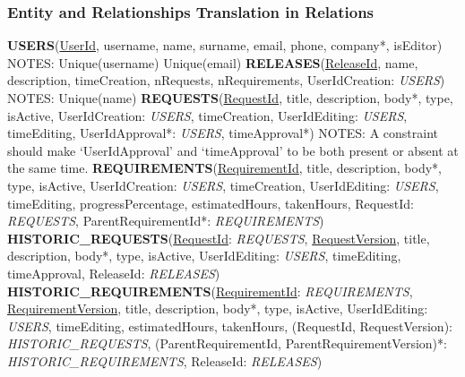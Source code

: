 \documentclass[12pt, a4paper]{report}
\begin{document}
\subsubsection*{Entity and Relationships Translation in Relations}

\textbf{USERS}(\underline{UserId}, username, name, surname, email, phone, company*, isEditor)\newline
\newline
NOTES:\newline
Unique(username)\newline
Unique(email)\newline
\newline
\textbf{RELEASES}(\underline{ReleaseId}, name, description, timeCreation, nRequests, nRequirements,
UserIdCreation: \textit{USERS})\newline
\newline
NOTES:\newline
Unique(name)\newline
\newline
\textbf{REQUESTS}(\underline{RequestId}, title, description, body*, type, isActive, UserIdCreation: \textit{USERS}, timeCreation,
UserIdEditing: \textit{USERS}, timeEditing, UserIdApproval*: \textit{USERS}, timeApproval*)\newline
\newline
NOTES:\newline
A constraint should make `UserIdApproval' and `timeApproval' to be both present or absent at the same time.\newline
\newline
\textbf{REQUIREMENTS}(\underline{RequirementId}, title, description, body*, type, isActive, UserIdCreation: \textit{USERS},
timeCreation, UserIdEditing: \textit{USERS}, timeEditing, progressPercentage, estimatedHours, takenHours,
RequestId: \textit{REQUESTS}, ParentRequirementId*: \textit{REQUIREMENTS})\newline
\newline
\textbf{HISTORIC\_REQUESTS}(\underline{RequestId}: \textit{REQUESTS}, \underline{RequestVersion}, title, description, body*, type,
isActive, UserIdEditing: \textit{USERS}, timeEditing, timeApproval, ReleaseId: \textit{RELEASES})\newline
\newline
\textbf{HISTORIC\_REQUIREMENTS}(\underline{RequirementId}: \textit{REQUIREMENTS}, \underline{RequirementVersion}, title,
description, body*, type, isActive, UserIdEditing: \textit{USERS}, timeEditing, estimatedHours, takenHours,
(RequestId, RequestVersion): \textit{HISTORIC\_REQUESTS},
(ParentRequirementId, ParentRequirementVersion)*: \textit{HISTORIC\_REQUIREMENTS}, ReleaseId: \textit{RELEASES})
\end{document}

